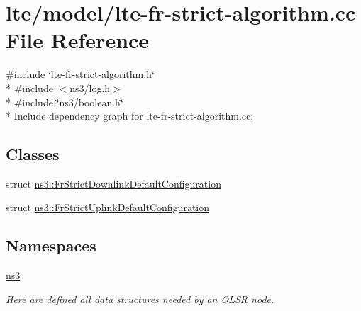 \hypertarget{lte-fr-strict-algorithm_8cc}{}\section{lte/model/lte-\/fr-\/strict-\/algorithm.cc File Reference}
\label{lte-fr-strict-algorithm_8cc}
{\ttfamily \#include \char`\"{}lte-\/fr-\/strict-\/algorithm.\+h\char`\"{}}\\*
{\ttfamily \#include $<$ns3/log.\+h$>$}\\*
{\ttfamily \#include \char`\"{}ns3/boolean.\+h\char`\"{}}\\*
Include dependency graph for lte-\/fr-\/strict-\/algorithm.cc\+:
\subsection*{Classes}
\begin{DoxyCompactItemize}
\item 
struct \hyperlink{structns3_1_1FrStrictDownlinkDefaultConfiguration}{ns3\+::\+Fr\+Strict\+Downlink\+Default\+Configuration}
\item 
struct \hyperlink{structns3_1_1FrStrictUplinkDefaultConfiguration}{ns3\+::\+Fr\+Strict\+Uplink\+Default\+Configuration}
\end{DoxyCompactItemize}
\subsection*{Namespaces}
\begin{DoxyCompactItemize}
\item 
 \hyperlink{namespacens3}{ns3}
\begin{DoxyCompactList}\small\item\em Here are defined all data structures needed by an O\+L\+SR node. \end{DoxyCompactList}\end{DoxyCompactItemize}
